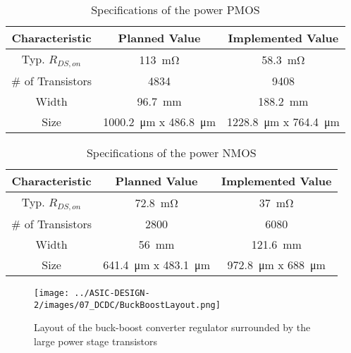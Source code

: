 \begin{table}[H]
    \centering
    \begin{tabular}{|c|c|c|}
        Characteristic & Planned Value & Implemented Value \\
        \hline
		 Typ. $R_{DS,on}$ & \qty{113}{\milli\ohm}  & \qty{58.3}{\milli\ohm} \\
         \# of Transistors & \qty{4834}{}  & \qty{9408}{} \\
		 Width & \qty{96.7}{\milli\meter} & \qty{188.2}{\milli\meter}\\
		 Size & \qty{1000.2}{\micro\meter} x \qty{486.8}{\micro\meter} & \qty{1228.8}{\micro\meter} x \qty{764.4}{\micro\meter}
    \end{tabular}
    \caption{Specifications of the power \ac{PMOS}}
    \label{tab:spec_pmos}
\end{table}

\begin{table}[H]
    \centering
    \begin{tabular}{|c|c|c|}
        Characteristic & Planned Value & Implemented Value \\
        \hline
		 Typ. $R_{DS,on}$ & \qty{72.8}{\milli\ohm} & \qty{37}{\milli\ohm} \\
         \# of Transistors & \qty{2800}{}  & \qty{6080}{} \\
		 Width & \qty{56}{\milli\meter} & \qty{121.6}{\milli\meter} \\
		 Size & \qty{641.4}{\micro\meter} x \qty{483.1}{\micro\meter} & \qty{972.8}{\micro\meter} x \qty{688}{\micro\meter}
    \end{tabular}
    \caption{Specifications of the power \ac{NMOS}}
    \label{tab:spec_nmos}
\end{table}

\begin{figure}[h]
    \centering
    \texttt{[image: ../ASIC-DESIGN-2/images/07\_DCDC/BuckBoostLayout.png]}
    \caption{Layout of the buck-boost converter regulator surrounded by the large power stage transistors}
    \label{fig:BBlayout}
\end{figure}

\clearpage

